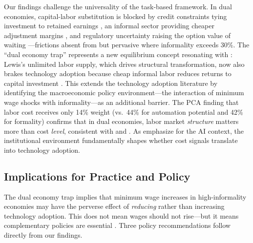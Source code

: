 \documentclass[5p,times,authoryear]{elsarticle}
\begin{document}
Our findings challenge the universality of the \citet{acemoglu2019automation} task-based framework. In dual economies, capital-labor substitution is blocked by credit constraints tying investment to retained earnings \citep{busso2020, hsieh2009misallocation}, an informal sector providing cheaper adjustment margins \citep{levy2008good, perry2007informality}, and regulatory uncertainty raising the option value of waiting \citep{prettner2020innovation}---frictions absent from \citet{acemoglu2022tasks} but pervasive where informality exceeds 30\%. The ``dual economy trap'' represents a new equilibrium concept resonating with \citet{lewis1954economic}: Lewis's unlimited labor supply, which drives structural transformation, now also brakes technology adoption because cheap informal labor reduces returns to capital investment \citep{loayza2011informal}. This extends the technology adoption literature \citep{atkin2017organizational, foster2010microeconomics, bloom2013management, cirera2017innovation} by identifying the macroeconomic policy environment---the interaction of minimum wage shocks with informality---as an additional barrier. The PCA finding that labor cost receives only 14\% weight (vs.\ 44\% for automation potential and 42\% for formality) confirms that in dual economies, labor market \emph{structure} matters more than cost \emph{level}, consistent with \citet{hsieh2009misallocation} and \citet{rodrik2016premature}. As \citet{acemoglu2024aijobs} emphasize for the AI context, the institutional environment fundamentally shapes whether cost signals translate into technology adoption.

\subsection{Implications for Practice and Policy}
\label{subsec:practice_policy}

The dual economy trap implies that minimum wage increases in high-informality economies may have the perverse effect of \emph{reducing} rather than increasing technology adoption. This does not mean wages should not rise---but it means complementary policies are essential \citep{worldbank2019wdr, ilo2024outlook}. Three policy recommendations follow directly from our findings.
\end{document}
